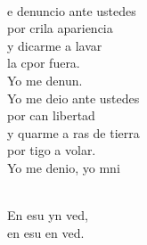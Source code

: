 \documentclass[12pt]{article}
\begin{document}
\begin{multicols*}{2}
\begin{cancion}
\begin{chorus}
	\end{chorus}%
	\jump\\
	e denuncio ante ustedes \\
	por crila apariencia \\
	y dicarme a lavar \\
	la cpor fuera. \\
	Yo me denun. \\
\jump
	Yo me deio ante ustedes \\
	por can libertad \\
	y quarme a ras de tierra \\
	por tigo a volar. \\
	Yo me denio, yo mni\\\jump\\
	\begin{chorus}%
	En esu yn ved, \\
	en esu en ved.\\
	\end{chorus}%
	\jump\\
\end{cancion}%


\end{multicols*}
\end{document}
